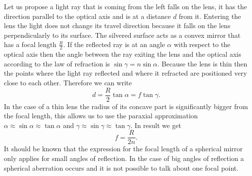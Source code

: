 \documentclass[11pt]{article}
\begin{document}

\solueng
Let us propose a light ray that is coming from the left falls on the lens, it has the direction parallel to the optical axis and is at a distance $d$ from it. Entering the lens the light does not change its travel direction because it falls on the lens perpendicularly to its surface. The silvered surface acts as a convex mirror that has a focal length $\frac{R}{2}$. If the reflected ray is at an angle $\alpha$ with respect to the optical axis then the angle between the ray exiting the lens and the optical axis according to the law of refraction is $\sin\gamma=n\sin\alpha$. Because the lens is thin then the points where the light ray reflected and where it refracted are positioned very close to each other. Therefore we can write
\[ d=\frac{R}{2}\tan\alpha=f\tan\gamma. \] 
In the case of a thin lens the radius of its concave part is significantly bigger from the focal length, this allows us to use the paraxial approximation $\alpha\approx\sin\alpha\approx\tan\alpha$ and $\gamma\approx\sin\gamma\approx\tan\gamma$. In result we get
\[ f=\frac{R}{2n}. \] 
It should be known that the expression for the focal length of a spherical mirror only applies for small angles of reflection. In the case of big angles of reflection a spherical aberration occurs and it is not possible to talk about one focal point. 
\begin{center}
\end{center}
\probend
\bigskip
\end{document}
